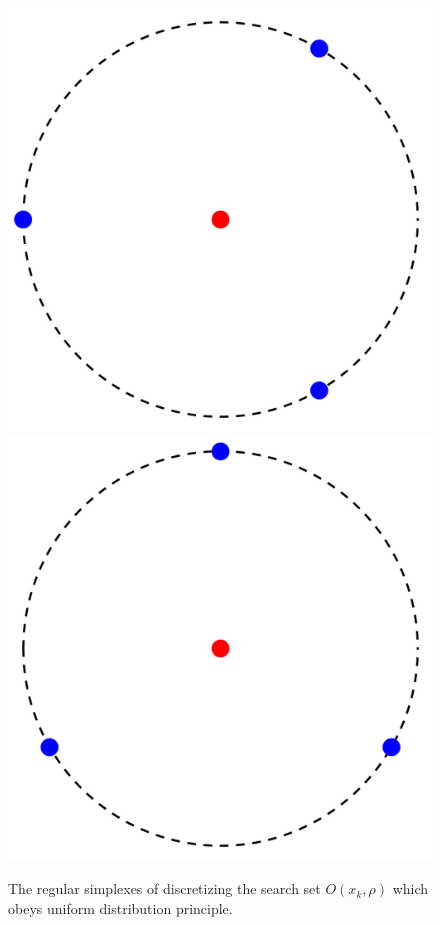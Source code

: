\documentclass[mathpazo]{csam}
\theoremstyle{remark}
\begin{document}
\begin{figure}[!htbp]
{		  \includegraphics[scale=0.1]{../figures/2D3.png}
		  \includegraphics[scale=0.1]{../figures/2D4.png}
	  }
	\caption{The regular simplexes of discretizing the search set $O(x_k, \rho)$
	which obeys uniform distribution principle.}
\label{fig:obset:sketch}
\end{figure}
\end{document}
